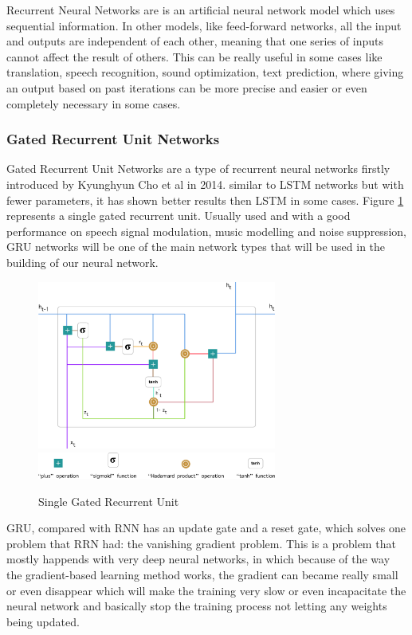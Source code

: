 Recurrent Neural Networks are is an artificial neural network model which uses sequential information. In other models, like feed-forward networks, all the input and outputs are independent of each other, meaning that one series of inputs cannot affect the result of others.
This can be really useful in some cases like translation, speech recognition, sound optimization, text prediction, where giving an output based on past iterations can be more precise and easier or even completely necessary in some cases.

\newpage
\subsubsection{Gated Recurrent Unit Networks} 

Gated Recurrent Unit Networks are a type of recurrent neural networks firstly introduced 
by Kyunghyun Cho et al in 2014. similar to LSTM networks but with fewer 
parameters, it has shown better results then LSTM in some cases. Figure \ref{fig:GRU} represents a single gated recurrent unit. 
Usually used and with a good performance on speech signal modulation, music modelling and noise suppression, 
GRU networks will be one of the main network types that will be used in the building of our neural network.

\begin{figure}[htp]
	\centering
	\includegraphics[width=0.7\textwidth]{Illustrations/GRU.png}
	\includegraphics[width=0.7\textwidth]{Illustrations/GRUsymbols.png}
	\caption{Single Gated Recurrent Unit}
	\label{fig:GRU}
\end{figure}


GRU, compared with RNN has an update gate and a reset gate, which solves one problem that RRN had: the vanishing gradient problem. This is a problem that mostly happends with very deep neural networks, in which because of the way the gradient-based learning method works, the gradient can became really small or even disappear which will make the training very slow or even incapacitate the neural network and basically stop the training process not letting any weights being updated.


